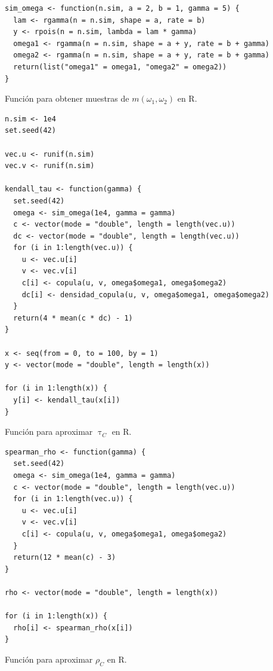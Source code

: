 \documentclass[11pt,a4paper]{article}
\begin{document}
\begin{table}[!htb]
\begin{lstlisting}
sim_omega <- function(n.sim, a = 2, b = 1, gamma = 5) {
  lam <- rgamma(n = n.sim, shape = a, rate = b)
  y <- rpois(n = n.sim, lambda = lam * gamma)
  omega1 <- rgamma(n = n.sim, shape = a + y, rate = b + gamma)
  omega2 <- rgamma(n = n.sim, shape = a + y, rate = b + gamma)
  return(list("omega1" = omega1, "omega2" = omega2))
}
\end{lstlisting}
\caption{Función para obtener muestras de $m(\omega_1, \omega_2)$ en R.}
\label{cod:fun_omega}
\end{table}

\begin{table}[!htb]
\begin{lstlisting}
n.sim <- 1e4
set.seed(42)

vec.u <- runif(n.sim)
vec.v <- runif(n.sim)

kendall_tau <- function(gamma) {
  set.seed(42)
  omega <- sim_omega(1e4, gamma = gamma)
  c <- vector(mode = "double", length = length(vec.u))
  dc <- vector(mode = "double", length = length(vec.u))
  for (i in 1:length(vec.u)) {
    u <- vec.u[i]
    v <- vec.v[i]
    c[i] <- copula(u, v, omega$omega1, omega$omega2)
    dc[i] <- densidad_copula(u, v, omega$omega1, omega$omega2)
  }
  return(4 * mean(c * dc) - 1)
}

x <- seq(from = 0, to = 100, by = 1)
y <- vector(mode = "double", length = length(x))

for (i in 1:length(x)) {
  y[i] <- kendall_tau(x[i])
}
\end{lstlisting}
\caption{Función para aproximar $\uptau_C$ en R.}
\label{cod:kendall_tau}
\end{table}

\begin{table}[!htb]
\begin{lstlisting}
spearman_rho <- function(gamma) {
  set.seed(42)
  omega <- sim_omega(1e4, gamma = gamma)
  c <- vector(mode = "double", length = length(vec.u))
  for (i in 1:length(vec.u)) {
    u <- vec.u[i]
    v <- vec.v[i]
    c[i] <- copula(u, v, omega$omega1, omega$omega2)
  }
  return(12 * mean(c) - 3)
}

rho <- vector(mode = "double", length = length(x))

for (i in 1:length(x)) {
  rho[i] <- spearman_rho(x[i])
}
\end{lstlisting}
\caption{Función para aproximar $\rho_C$ en R.}
\label{cod:spearman_rho}
\end{table}
\end{document}
